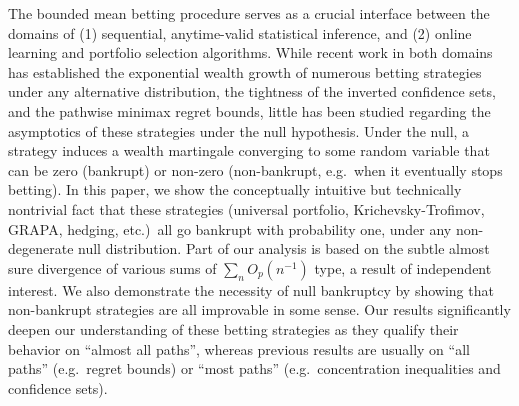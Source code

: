 The bounded mean betting procedure serves as a crucial interface between the domains of (1) sequential, anytime-valid statistical inference, and (2) online learning and portfolio selection algorithms. While recent work in both domains has established the exponential wealth growth of numerous betting strategies under any alternative distribution, the tightness of the inverted confidence sets, and the pathwise minimax regret bounds, little has been studied regarding the asymptotics of these strategies under the null hypothesis. Under the null, a strategy 
induces a wealth martingale converging to some random variable that can be zero (bankrupt) or non-zero (non-bankrupt, e.g.\ when it eventually stops betting). 
In this paper, we show the conceptually intuitive but technically nontrivial fact that these strategies (universal portfolio, Krichevsky-Trofimov, GRAPA, hedging, etc.)\ all go bankrupt with probability one, under any non-degenerate null distribution. Part of our analysis is based on the subtle almost sure divergence of various sums of $\sum_n O_p(n^{-1})$ type, 
a result of independent interest.
We also demonstrate the necessity of null bankruptcy by showing that non-bankrupt strategies are all improvable in some sense.
Our results significantly deepen our understanding of these betting strategies as they qualify their behavior on ``almost all paths'', whereas previous results are usually on ``all paths'' (e.g.\ regret bounds) or ``most paths'' (e.g.\ concentration inequalities and confidence sets).
  